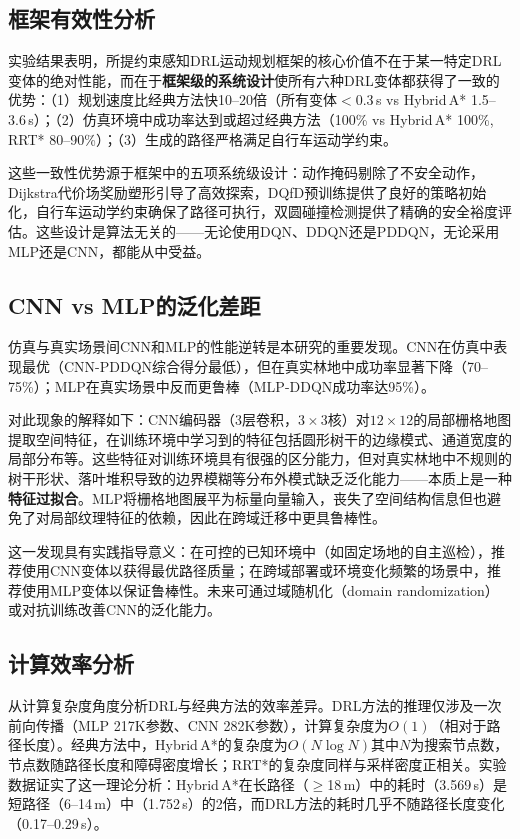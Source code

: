 \documentclass[twocolumn]{elsarticle}
\begin{document}
\subsection{框架有效性分析}

实验结果表明，所提约束感知DRL运动规划框架的核心价值不在于某一特定DRL变体的绝对性能，而在于\textbf{框架级的系统设计}使所有六种DRL变体都获得了一致的优势：（1）规划速度比经典方法快10--20倍（所有变体$<$0.3\,s vs Hybrid\,A* 1.5--3.6\,s）；（2）仿真环境中成功率达到或超过经典方法（100\% vs Hybrid\,A* 100\%, RRT* 80--90\%）；（3）生成的路径严格满足自行车运动学约束。

这些一致性优势源于框架中的五项系统级设计：动作掩码剔除了不安全动作，Dijkstra代价场奖励塑形引导了高效探索，DQfD预训练提供了良好的策略初始化，自行车运动学约束确保了路径可执行，双圆碰撞检测提供了精确的安全裕度评估。这些设计是算法无关的——无论使用DQN、DDQN还是PDDQN，无论采用MLP还是CNN，都能从中受益。

\subsection{CNN vs MLP的泛化差距}

仿真与真实场景间CNN和MLP的性能逆转是本研究的重要发现。CNN在仿真中表现最优（CNN-PDDQN综合得分最低），但在真实林地中成功率显著下降（70--75\%）；MLP在真实场景中反而更鲁棒（MLP-DDQN成功率达95\%）。

对此现象的解释如下：CNN编码器（3层卷积，$3\times3$核）对$12\times12$的局部栅格地图提取空间特征，在训练环境中学习到的特征包括圆形树干的边缘模式、通道宽度的局部分布等。这些特征对训练环境具有很强的区分能力，但对真实林地中不规则的树干形状、落叶堆积导致的边界模糊等分布外模式缺乏泛化能力——本质上是一种\textbf{特征过拟合}。MLP将栅格地图展平为标量向量输入，丧失了空间结构信息但也避免了对局部纹理特征的依赖，因此在跨域迁移中更具鲁棒性。

这一发现具有实践指导意义：在可控的已知环境中（如固定场地的自主巡检），推荐使用CNN变体以获得最优路径质量；在跨域部署或环境变化频繁的场景中，推荐使用MLP变体以保证鲁棒性。未来可通过域随机化（domain randomization）或对抗训练改善CNN的泛化能力。

\subsection{计算效率分析}

从计算复杂度角度分析DRL与经典方法的效率差异。DRL方法的推理仅涉及一次前向传播（MLP 217K参数、CNN 282K参数），计算复杂度为$O(1)$（相对于路径长度）。经典方法中，Hybrid\,A*的复杂度为$O(N\log N)$其中$N$为搜索节点数，节点数随路径长度和障碍密度增长；RRT*的复杂度同样与采样密度正相关。实验数据证实了这一理论分析：Hybrid\,A*在长路径（$\geq$18\,m）中的耗时（3.569\,s）是短路径（6--14\,m）中（1.752\,s）的2倍，而DRL方法的耗时几乎不随路径长度变化（0.17--0.29\,s）。
\end{document}
